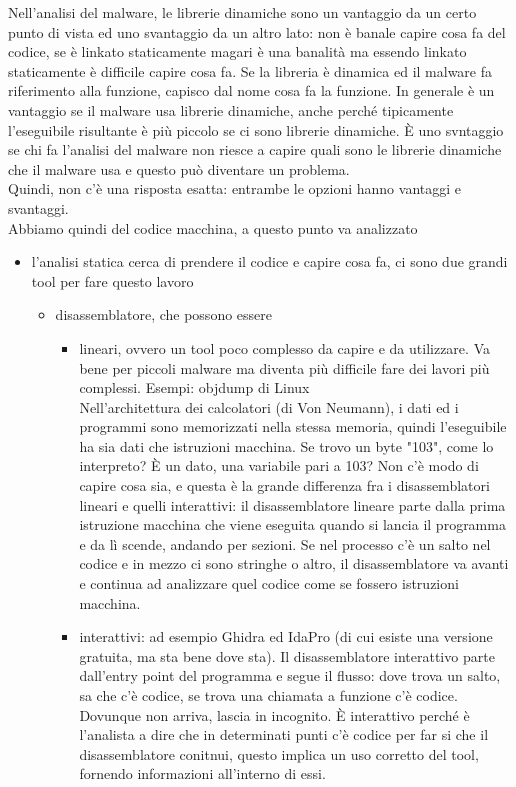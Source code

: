 \documentclass{article}
\begin{document}
Nell'analisi del malware, le librerie dinamiche sono un vantaggio da un certo punto di vista ed uno svantaggio da un altro lato: non è banale capire cosa fa del codice, se è linkato staticamente magari è una banalità ma essendo linkato staticamente è difficile capire cosa fa. Se la libreria è dinamica ed il malware fa riferimento alla funzione, capisco dal nome cosa fa la funzione. In generale è un vantaggio se il malware usa librerie dinamiche, anche perché tipicamente l'eseguibile risultante è più piccolo se ci sono librerie dinamiche. È uno svntaggio se chi fa l'analisi del malware non riesce a capire quali sono le librerie dinamiche che il malware usa e questo può diventare un problema.\\ Quindi, non c'è una risposta esatta: entrambe le opzioni hanno vantaggi e svantaggi.\\ Abbiamo quindi del codice macchina, a questo punto va analizzato
\begin{itemize}
\item l'analisi statica cerca di prendere il codice e capire cosa fa, ci sono due grandi tool per fare questo lavoro
\begin{itemize}
\item disassemblatore, che possono essere
\begin{itemize}
\item lineari, ovvero un tool poco complesso da capire e da utilizzare. Va bene per piccoli malware ma diventa più difficile fare dei lavori più complessi. Esempi: objdump di Linux\\ Nell'architettura dei calcolatori (di Von Neumann), i dati ed i programmi sono memorizzati nella stessa memoria, quindi l'eseguibile ha sia dati che istruzioni macchina. Se trovo un byte "103", come lo interpreto? È un dato, una variabile pari a 103? Non c'è modo di capire cosa sia, e questa è la grande differenza fra i disassemblatori lineari e quelli interattivi: il disassemblatore lineare parte dalla prima istruzione macchina che viene eseguita quando si lancia il programma e da lì scende, andando per sezioni. Se nel processo c'è un salto nel codice e in mezzo ci sono stringhe o altro, il disassemblatore va avanti e continua ad analizzare quel codice come se fossero istruzioni macchina.
\item interattivi: ad esempio Ghidra ed IdaPro (di cui esiste una versione gratuita, ma sta bene dove sta). Il disassemblatore interattivo parte dall'entry point del programma e segue il flusso: dove trova un salto, sa che c'è codice, se trova una chiamata a funzione c'è codice. Dovunque non arriva, lascia in incognito. È interattivo perché è l'analista a dire che in determinati punti c'è codice per far si che il disassemblatore conitnui, questo implica un uso corretto del tool, fornendo informazioni all'interno di essi.
\end{itemize}
\end{itemize}
\end{itemize}
\end{document}
